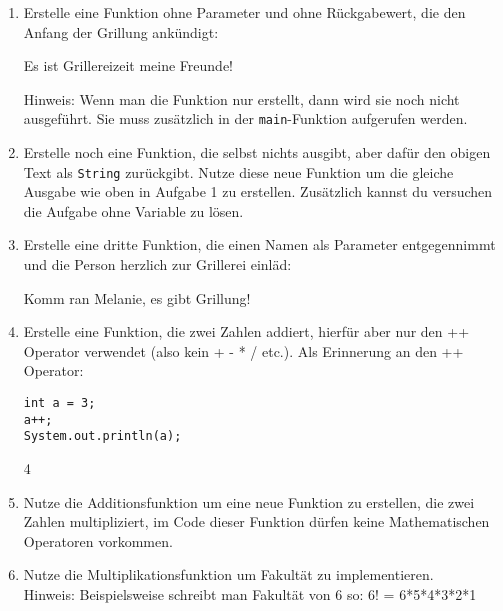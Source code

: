 \documentclass{../../sheet}
\begin{document}
\newpage


\begin{enumerate}
    \item Erstelle eine Funktion ohne Parameter und ohne Rückgabewert, die den Anfang der Grillung ankündigt:
          \begin{ausgabe}
              Es ist Grillereizeit meine Freunde!
          \end{ausgabe}
          Hinweis: Wenn man die Funktion nur erstellt, dann wird sie noch nicht ausgeführt. Sie muss zusätzlich in der \texttt{main}-Funktion aufgerufen werden.
    \item Erstelle noch eine Funktion, die selbst nichts ausgibt, aber dafür den obigen Text als \texttt{String} zurückgibt. Nutze diese neue Funktion um die gleiche Ausgabe wie oben in Aufgabe 1 zu erstellen. Zusätzlich kannst du versuchen die Aufgabe ohne Variable zu lösen.
    \item Erstelle eine dritte Funktion, die einen Namen als Parameter entgegennimmt und die Person herzlich zur Grillerei einläd:
          \begin{ausgabe}
              Komm ran Melanie, es gibt Grillung!
          \end{ausgabe}
    \item Erstelle eine Funktion, die zwei Zahlen addiert, hierfür aber nur den ++ Operator verwendet (also kein + - * / etc.). Als Erinnerung an den ++ Operator:
          \begin{verbatim}
int a = 3;
a++;
System.out.println(a);
    \end{verbatim}
          \begin{ausgabe}
              4
          \end{ausgabe}
    \item Nutze die Additionsfunktion um eine neue Funktion zu erstellen, die zwei Zahlen multipliziert, im Code dieser Funktion dürfen keine Mathematischen Operatoren vorkommen.
    \item Nutze die Multiplikationsfunktion um Fakultät zu implementieren.\\
          Hinweis: Beispielsweise schreibt man Fakultät von 6 so: 6! = 6*5*4*3*2*1
\end{enumerate}

\newpage
{}
\end{document}
